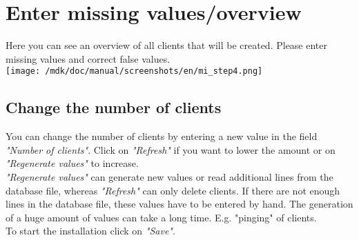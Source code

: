 \section{Enter missing values/overview}Here you can see an overview of all clients that will be created. Please enter missing values and correct false values.\\
\texttt{[image: /mdk/doc/manual/screenshots/en/mi\_step4.png]} \\
\subsection{Change the number of clients}
You can change the number of clients by entering a new value in the field \textit{"Number of clients"}. Click on \textit{"Refresh"} if you want to lower the amount or on \textit{"Regenerate values"} to increase.\\
\textit{"Regenerate values"} can generate new values or read additional lines from the database file, whereas \textit{"Refresh"} can only delete clients. If there are not enough lines in the database file, these values have to be entered by hand. The generation of a huge amount of values can take a long time. E.g. "pinging" of clients.\\
To start the installation click on \textit{"Save"}.\\
